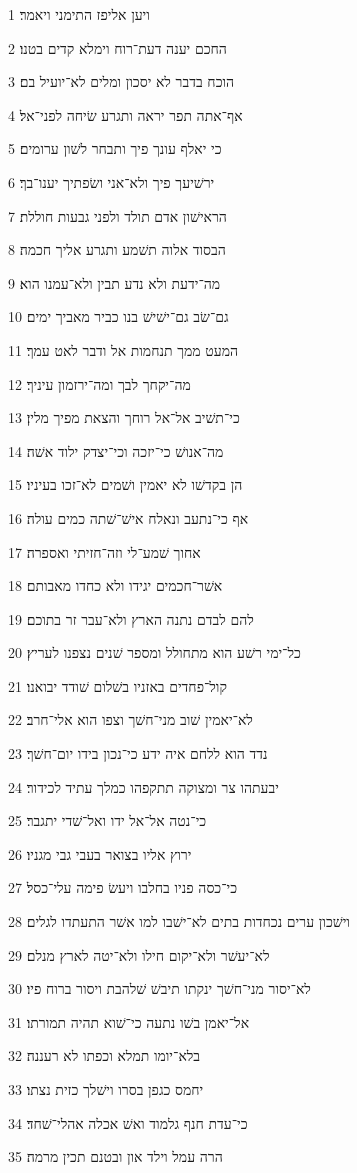 \par 1 ויען אליפז התימני ויאמר׃
\par 2 החכם יענה דעת־רוח וימלא קדים בטנו׃
\par 3 הוכח בדבר לא יסכון ומלים לא־יועיל בם׃
\par 4 אף־אתה תפר יראה ותגרע שׂיחה לפני־אל׃
\par 5 כי יאלף עונך פיך ותבחר לשׁון ערומים׃
\par 6 ירשׁיעך פיך ולא־אני ושׂפתיך יענו־בך׃
\par 7 הראישׁון אדם תולד ולפני גבעות חוללת׃
\par 8 הבסוד אלוה תשׁמע ותגרע אליך חכמה׃
\par 9 מה־ידעת ולא נדע תבין ולא־עמנו הוא׃
\par 10 גם־שׂב גם־ישׁישׁ בנו כביר מאביך ימים׃
\par 11 המעט ממך תנחמות אל ודבר לאט עמך׃
\par 12 מה־יקחך לבך ומה־ירזמון עיניך׃
\par 13 כי־תשׁיב אל־אל רוחך והצאת מפיך מלין׃
\par 14 מה־אנושׁ כי־יזכה וכי־יצדק ילוד אשׁה׃
\par 15 הן בקדשׁו לא יאמין ושׁמים לא־זכו בעיניו׃
\par 16 אף כי־נתעב ונאלח אישׁ־שׁתה כמים עולה׃
\par 17 אחוך שׁמע־לי וזה־חזיתי ואספרה׃
\par 18 אשׁר־חכמים יגידו ולא כחדו מאבותם׃
\par 19 להם לבדם נתנה הארץ ולא־עבר זר בתוכם׃
\par 20 כל־ימי רשׁע הוא מתחולל ומספר שׁנים נצפנו לעריץ׃
\par 21 קול־פחדים באזניו בשׁלום שׁודד יבואנו׃
\par 22 לא־יאמין שׁוב מני־חשׁך וצפו הוא אלי־חרב׃
\par 23 נדד הוא ללחם איה ידע כי־נכון בידו יום־חשׁך׃
\par 24 יבעתהו צר ומצוקה תתקפהו כמלך עתיד לכידור׃
\par 25 כי־נטה אל־אל ידו ואל־שׁדי יתגבר׃
\par 26 ירוץ אליו בצואר בעבי גבי מגניו׃
\par 27 כי־כסה פניו בחלבו ויעשׂ פימה עלי־כסל׃
\par 28 וישׁכון ערים נכחדות בתים לא־ישׁבו למו אשׁר התעתדו לגלים׃
\par 29 לא־יעשׁר ולא־יקום חילו ולא־יטה לארץ מנלם׃
\par 30 לא־יסור מני־חשׁך ינקתו תיבשׁ שׁלהבת ויסור ברוח פיו׃
\par 31 אל־יאמן בשׁו נתעה כי־שׁוא תהיה תמורתו׃
\par 32 בלא־יומו תמלא וכפתו לא רעננה׃
\par 33 יחמס כגפן בסרו וישׁלך כזית נצתו׃
\par 34 כי־עדת חנף גלמוד ואשׁ אכלה אהלי־שׁחד׃
\par 35 הרה עמל וילד און ובטנם תכין מרמה׃

